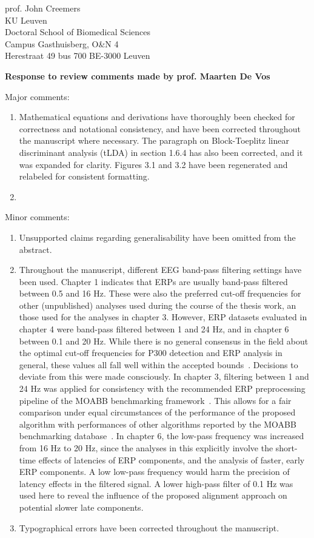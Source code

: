\documentclass{letter}
\newcommand{\reply}[1]{%
	\textbf{Response to review comments made by prof. #1}

}
\begin{document}
\begin{letter}{
	prof. John Creemers \\
	KU Leuven \\
	Doctoral School of Biomedical Sciences \\
	Campus Gasthuisberg, O\&N 4 \\
	Herestraat 49 bus 700
	BE-3000 Leuven

}
\reply{Maarten De Vos}
Major comments:
\begin{enumerate}
	\item Mathematical equations and derivations have thoroughly
	been checked for correctness and notational consistency, and have been
	corrected throughout the manuscript where necessary.
	The paragraph on Block-Toeplitz linear discriminant analysis (tLDA) in
	section 1.6.4 has also been corrected, and it was expanded for clarity.
	Figures 3.1 and 3.2 have been regenerated and relabeled for consistent
	formatting.
	\item {}
\end{enumerate}
Minor comments:
\begin{enumerate}
	\item Unsupported claims regarding generalisability have been omitted
	from the abstract.
	\item Throughout the manuscript, different EEG band-pass filtering
	settings have been used.
	Chapter 1 indicates that ERPs are usually band-pass filtered between
	0.5 and 16 Hz.
	These were also the preferred cut-off frequencies for other
	(unpublished) analyses used during the course of the thesis work, an
	those used for the analyses in chapter 3.
	However, ERP datasets evaluated in chapter 4 were band-pass filtered
	between 1 and 24 Hz, and in chapter 6 between 0.1 and 20 Hz.
	While there is no general consensus in the field about the optimal
	cut-off frequencies for P300 detection and ERP analysis in general,
	these values all fall well within the accepted
	bounds~\cite{Bougrain2012}.
	Decisions to deviate from this were made consciously.
	In chapter 3, filtering between 1 and 24 Hz was applied for consistency
	with the recommended ERP preprocessing pipeline of the MOABB
	benchmarking framework~\cite{Aristimunha2023}.
	This allows for a fair comparison under equal circumstances of the
	performance of the proposed algorithm with performances of other
	algorithms reported by the MOABB benchmarking
	database~\cite{Chevallier2024}.
	In chapter 6, the low-pass frequency was increased from 16 Hz to 20 Hz,
	since the analyses in this explicitly involve the short-time effects of
	latencies of ERP components, and the analysis of faster, early ERP
	components. A low low-pass frequency would harm the precision of
	latency effects in the filtered signal.
	A lower high-pass filter of 0.1 Hz was used here to reveal the
	influence of the proposed alignment approach on potential
	slower late components.
	\item Typographical errors have been corrected throughout the
	manuscript.
\end{enumerate}


\end{letter}
\end{document}

